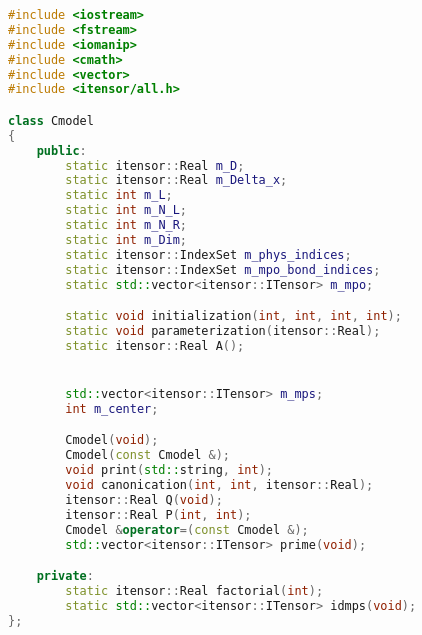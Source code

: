 \begin{spacing}{0.89} %

\begin{lstlisting}[language=C++, caption={\texttt{Class\_model.h}.}]
#include <iostream>
#include <fstream>
#include <iomanip>
#include <cmath>
#include <vector>
#include <itensor/all.h>

class Cmodel
{
	public:
		static itensor::Real m_D;
		static itensor::Real m_Delta_x;
		static int m_L;
		static int m_N_L;
		static int m_N_R;
		static int m_Dim;
		static itensor::IndexSet m_phys_indices;
		static itensor::IndexSet m_mpo_bond_indices;
		static std::vector<itensor::ITensor> m_mpo;

		static void initialization(int, int, int, int);
		static void parameterization(itensor::Real);
		static itensor::Real A();


		std::vector<itensor::ITensor> m_mps;
		int m_center;

		Cmodel(void);
		Cmodel(const Cmodel &);
		void print(std::string, int);
		void canonication(int, int, itensor::Real);
		itensor::Real Q(void);
		itensor::Real P(int, int);
		Cmodel &operator=(const Cmodel &);
		std::vector<itensor::ITensor> prime(void);

	private:
		static itensor::Real factorial(int);
		static std::vector<itensor::ITensor> idmps(void);
};
\end{lstlisting}

\end{spacing}

